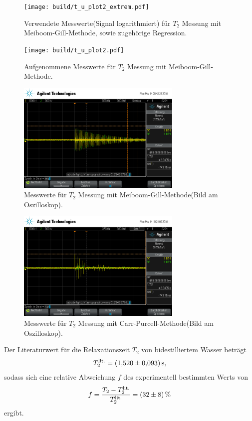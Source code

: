 \begin{figure}[hhh]
  \centering
  \texttt{[image: build/t\_u\_plot2\_extrem.pdf]}
  \caption{Verwendete Messwerte(Signal logarithmiert) für $T_{2}$ Messung mit Meiboom-Gill-Methode, sowie zugehörige Regression.}
  \label{fig:t2_gesamt}
\end{figure}


\begin{figure}[hhh]
  \centering
  \texttt{[image: build/t\_u\_plot2.pdf]}
  \caption{Aufgenommene Messwerte für $T_{2}$ Messung mit Meiboom-Gill-Methode.}
  \label{fig:t2_plot}
\end{figure}


\begin{figure}[hhh]
  \centering
  \includegraphics[width=0.7\textwidth]{mg.png}
  \caption{Messwerte für $T_{2}$ Messung mit Meiboom-Gill-Methode(Bild am Oszilloskop).}
  \label{fig:meiboomgill}
\end{figure}

\begin{figure}[hhh]
  \centering
  \includegraphics[width=0.7\textwidth]{cp.png}
  \caption{Messwerte für $T_{2}$ Messung mit Carr-Purcell-Methode(Bild am Oszilloskop).}
  \label{fig:carrpucell}
\end{figure}


Der Literaturwert\cite{litwerte} für die Relaxationszeit $T_{2}$ von bidestilliertem Wasser
beträgt
\begin{align*}
  T_{2}^\text{lit.} = \SI{1.52+-0.093}{\second},
\end{align*}
sodass sich eine relative Abweichung $f$ des experimentell bestimmten Werts
von
\begin{align*}
  f = \frac{T_{2} - T_{2}^\text{lit.}}{T_{2}^\text{lit.}} = \SI{32+-8}{\percent}
\end{align*}
ergibt.


